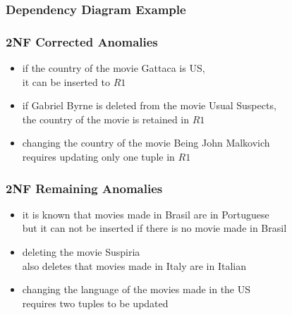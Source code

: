 \documentclass[dvipsnames]{beamer}
\begin{document}
\begin{frame}
  \frametitle{Dependency Diagram Example}

  \begin{example}
    \begin{center}
    \end{center}
  \end{example}
\end{frame}

\begin{frame}
  \frametitle{2NF Corrected Anomalies}

  \begin{example}
    \begin{itemize}
      \item if the country of the movie Gattaca is US,\\
	it can be inserted to $R1$

      \pause
      \item if Gabriel Byrne is deleted from the movie Usual Suspects,\\
	the country of the movie is retained in $R1$

      \pause
      \item changing the country of the movie Being John Malkovich\\
	requires updating only one tuple in $R1$
    \end{itemize}
  \end{example}
\end{frame}

\begin{frame}
  \frametitle{2NF Remaining Anomalies}

  \begin{example}
    \begin{itemize}
      \item it is known that movies made in Brasil are in Portuguese\\
	but it can not be inserted if there is no movie made in Brasil

      \pause
      \item deleting the movie Suspiria\\
	also deletes that movies made in Italy are in Italian

      \pause
      \item changing the language of the movies made in the US\\
	requires two tuples to be updated
    \end{itemize}
  \end{example}
\end{frame}
\end{document}
